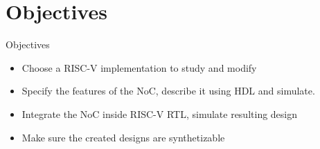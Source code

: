 
\ifconcurso
\else
    \section{Objectives}
    
    \begin{frame}{Objectives}
        \begin{itemize}
            \item Choose a RISC-V implementation to study and modify
            \item Specify the features of the NoC, describe it using HDL and simulate.
            \item Integrate the NoC inside RISC-V RTL, simulate resulting design
            \item Make sure the created designs are synthetizable
        \end{itemize}
    \end{frame}
\fi
